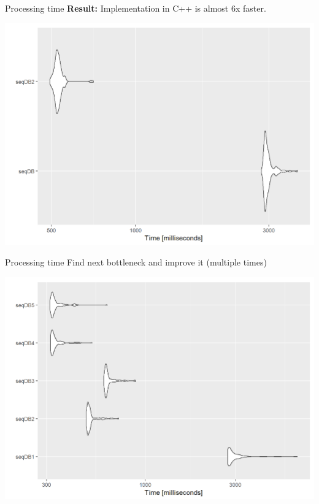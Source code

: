 \documentclass[11pt,t]{beamer}
\begin{document}
\begin{frame}[fragile]{Processing time}
\textbf{Result:} Implementation in C++ is almost 6x faster.
	\vspace*{-3mm}
	\begin{center}
		\includegraphics[scale = .5]{mygraphics/benchmark1.png}
	\end{center}
\end{frame}

\begin{frame}[fragile]{Processing time}
	Find next bottleneck and improve it (multiple times)
	\vspace*{-3mm}
	\begin{center}
		\includegraphics[scale = .5]{mygraphics/benchmark2.png}
	\end{center}
\end{frame}
\end{document}
